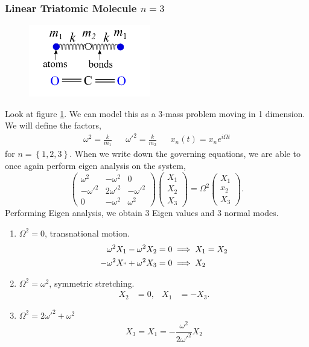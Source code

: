 \documentclass{book}
\begin{document}
\subsubsection{Linear Triatomic Molecule $n = 3$}
\begin{figure}
    \centering
    \includegraphics[width=150pt]{coupled_osc16.png}
    \caption{}
    \label{fig:n=3}
\end{figure}
Look at figure \ref{fig:n=3}. We can model this as a 3-mass problem moving in 1 dimension. We will define the factors,
\begin{align}
    \omega^2 = \frac{k}{m_1} && \omega'^2 = \frac{k}{m_2} && x_n(t) = x_ne^{i\Omega t}
\end{align}
for $n = \left\{1,2,3\right\}$. When we write down the governing equations, we are able to once again perform eigen analysis on the system,
\begin{equation}
    \begin{pmatrix}
        \omega^2 & -\omega^2 & 0 \\
        -\omega'^2 & 2\omega'^2 & -\omega'^2 \\
        0 & -\omega^2 & \omega^2
    \end{pmatrix}\begin{pmatrix}
        X_1 \\ X_2 \\ X_3
    \end{pmatrix} = \Omega^2 \begin{pmatrix}
        X_1 \\ x_2 \\ X_3
    \end{pmatrix}.
\end{equation}
Performing Eigen analysis, we obtain 3 Eigen values and 3 normal modes. 
\begin{enumerate}
    \item $\Omega^2 = 0$, transnational motion.
    \begin{align*}
        \omega^2X_1 - \omega^2X_2 = 0 & \implies X_1 = X_2 \\
        -\omega^2X_" + \omega^2X_3 = 0 & \implies X_2 
    \end{align*}
    \item $\Omega^2 = \omega^2$, symmetric stretching. 
    \begin{align}
        X_2 & = 0, & X_1 & = -X_3.
    \end{align}
    \item $\Omega^2 = 2\omega'^2 + \omega^2$
    \begin{equation*}
        X_3 = X_1 = -\frac{\omega^2}{2\omega'^2}X_2
    \end{equation*}
\end{enumerate}
\end{document}
